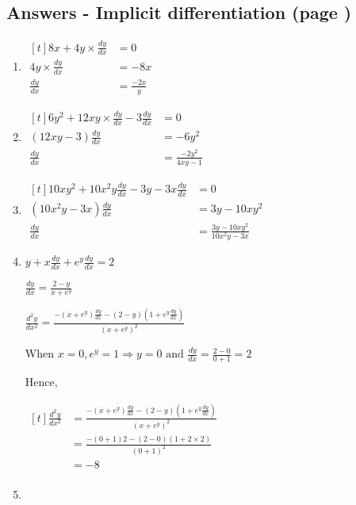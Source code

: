\documentclass[../main.tex]{subfiles}
\begin{document}
\subsection*{Answers - Implicit differentiation (page \pageref{Implicit Differentiation})}

\begin{spacing}{1.5}
\begin{enumerate}
    \item
    $
    \!
    \begin{aligned}[t]
        8x + 4y\times\frac{dy}{dx}
        &= 0 \\
        4y\times\frac{dy}{dx}
        &=-8x\\
        \frac{dy}{dx}
        &=\frac{-2x}{y}
    \end{aligned}
    $
    \item 
    $
    \!
    \begin{aligned}[t]
        6y^2+12xy\times\frac{dy}{dx}-3\frac{dy}{dx}
        &=0\\
        (12xy-3)\frac{dy}{dx}
        &=-6y^2\\
        \frac{dy}{dx}
        &=\frac{-2y^2}{4xy-1}
    \end{aligned}
    $
    \item 
    $
    \!
    \begin{aligned}[t]
        10xy^2+10x^2y\frac{dy}{dx}-3y-3x\frac{dy}{dx}
        &=0\\
        (10x^2y-3x)\frac{dy}{dx}
        &=3y-10xy^2\\
        \frac{dy}{dx}
        &=\frac{3y-10xy^2}{10x^2y-3x}
    \end{aligned}
    $
    \item 
    \(y+x\frac{dy}{dx}+e^y\frac{dy}{dx}=2\)

    \(\frac{dy}{dx}=\frac{2-y}{x+e^y} \) 

    \(\frac{d^2y}{dx^2}=\frac{-(x+e^y)\frac{dy}{dx}-(2-y)(1+e^y\frac{dy}{dx})}{(x+e^y)^2}\)

    When \(x=0, e^y=1\Rightarrow{}y=0\text{ and }\frac{dy}{dx}=\frac{2-0}{0+1}=2\)

    Hence,

    $
    \!
    \begin{aligned}[t]
        \frac{d^2y}{dx^2}
        &=\frac{-(x+e^y)\frac{dy}{dx}-(2-y)(1+e^y\frac{dy}{dx})}{(x+e^y)^2}\\
        &=\frac{-(0+1)2-(2-0)(1+2\times2)}{(0+1)^2}\\
        &=-8\\
    \end{aligned}
    $
    \item 
    

\end{enumerate}
\end{spacing}
\end{document}
